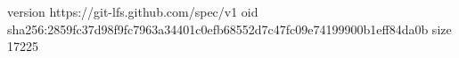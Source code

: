 version https://git-lfs.github.com/spec/v1
oid sha256:2859fc37d98f9fc7963a34401c0efb68552d7c47fc09e74199900b1eff84da0b
size 17225
